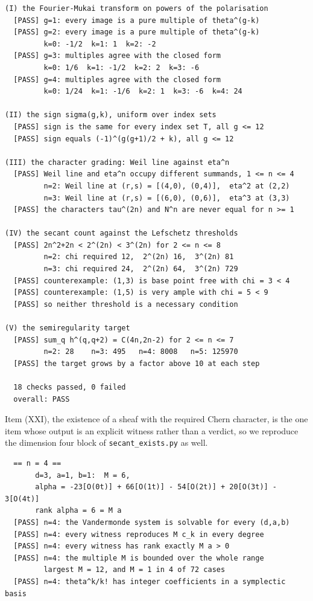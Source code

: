 \begin{small}
\begin{verbatim}
(I) the Fourier-Mukai transform on powers of the polarisation
  [PASS] g=1: every image is a pure multiple of theta^(g-k)
  [PASS] g=2: every image is a pure multiple of theta^(g-k)
         k=0: -1/2  k=1: 1  k=2: -2
  [PASS] g=3: multiples agree with the closed form
         k=0: 1/6  k=1: -1/2  k=2: 2  k=3: -6
  [PASS] g=4: multiples agree with the closed form
         k=0: 1/24  k=1: -1/6  k=2: 1  k=3: -6  k=4: 24

(II) the sign sigma(g,k), uniform over index sets
  [PASS] sign is the same for every index set T, all g <= 12
  [PASS] sign equals (-1)^(g(g+1)/2 + k), all g <= 12

(III) the character grading: Weil line against eta^n
  [PASS] Weil line and eta^n occupy different summands, 1 <= n <= 4
         n=2: Weil line at (r,s) = [(4,0), (0,4)],  eta^2 at (2,2)
         n=3: Weil line at (r,s) = [(6,0), (0,6)],  eta^3 at (3,3)
  [PASS] the characters tau^(2n) and N^n are never equal for n >= 1

(IV) the secant count against the Lefschetz thresholds
  [PASS] 2n^2+2n < 2^(2n) < 3^(2n) for 2 <= n <= 8
         n=2: chi required 12,  2^(2n) 16,  3^(2n) 81
         n=3: chi required 24,  2^(2n) 64,  3^(2n) 729
  [PASS] counterexample: (1,3) is base point free with chi = 3 < 4
  [PASS] counterexample: (1,5) is very ample with chi = 5 < 9
  [PASS] so neither threshold is a necessary condition

(V) the semiregularity target
  [PASS] sum_q h^(q,q+2) = C(4n,2n-2) for 2 <= n <= 7
         n=2: 28    n=3: 495   n=4: 8008   n=5: 125970
  [PASS] the target grows by a factor above 10 at each step

  18 checks passed, 0 failed
  overall: PASS
\end{verbatim}
\end{small}

Item (XXI), the existence of a sheaf with the required Chern character, is the
one item whose output is an explicit witness rather than a verdict, so we
reproduce the dimension four block of \texttt{secant\_exists.py} as well.

\begin{small}
\begin{verbatim}
  == n = 4 ==
       d=3, a=1, b=1:  M = 6,
       alpha = -23[O(0t)] + 66[O(1t)] - 54[O(2t)] + 20[O(3t)] - 3[O(4t)]
       rank alpha = 6 = M a
  [PASS] n=4: the Vandermonde system is solvable for every (d,a,b)
  [PASS] n=4: every witness reproduces M c_k in every degree
  [PASS] n=4: every witness has rank exactly M a > 0
  [PASS] n=4: the multiple M is bounded over the whole range
         largest M = 12, and M = 1 in 4 of 72 cases
  [PASS] n=4: theta^k/k! has integer coefficients in a symplectic basis
\end{verbatim}
\end{small}

